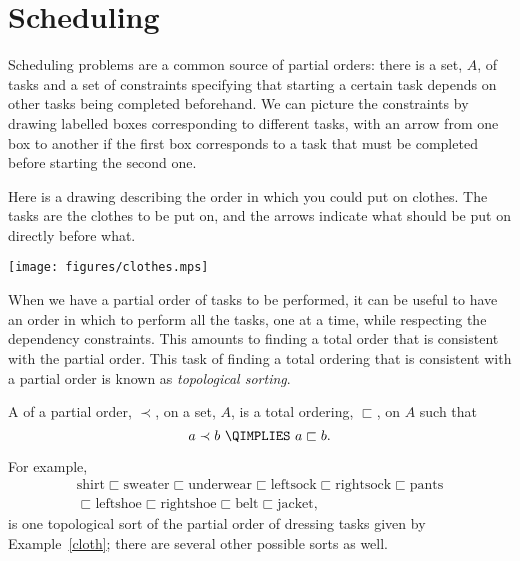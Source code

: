 \section{Scheduling}

Scheduling problems are a common source of partial orders: there is a set,
$A$, of tasks and a set of constraints specifying that starting a certain
task depends on other tasks being completed beforehand.  We can picture
the constraints by drawing labelled boxes corresponding to different
tasks, with an arrow from one box to another if the first box corresponds
to a task that must be completed before starting the second one.

\begin{samepage}
\begin{example}\label{cloth}
Here is a drawing describing the order in which you could put on clothes.
The tasks are the clothes to be put on, and the arrows indicate what should be
put on directly before what.
\begin{center}\texttt{[image: figures/clothes.mps]}\end{center}
\end{example}
\end{samepage}

When we have a partial order of tasks to be performed, it can be useful to
have an order in which to perform all the tasks, one at a time, while
respecting the dependency constraints.  This amounts to finding a total
order that is consistent with the partial order.  This task of finding a
total ordering that is consistent with a partial order is known as
\emph{topological sorting}. \iffalse probably because the sort is based
only on the topology (shape) of the poset and not on the actual values.\fi

\begin{definition}
A  of a partial order, $\prec$, on a set, $A$, is
a total ordering, $\sqsubset$, on $A$ such that
\[
a \prec b\ \QIMPLIES\  a \sqsubset b.
\]
\end{definition}

For example,
\begin{align*}
  \text{shirt} \sqsubset \text{sweater} \sqsubset \text{underwear}
  \sqsubset \text{leftsock}
  \sqsubset \text{rightsock} \sqsubset \text{pants}\\
  \sqsubset \text{leftshoe} \sqsubset \text{rightshoe} \sqsubset
  \text{belt} \sqsubset \text{jacket},
\end{align*}
is one topological sort of the partial order of dressing tasks given by
Example~\ref{cloth}; there are several other possible sorts as well.

